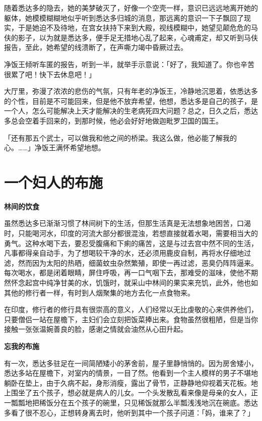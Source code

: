 \documentclass[twoside,openany]{book}
\newcommand{\mt}[1]{\textbullet \textbf{#1}}
\begin{document}
随着悉达多的隐去，她的美梦破灭了，好像一个空壳一样，意识已远远地离开她的躯体，她模模糊糊地似乎听到悉达多归城的消息，那远离的意识一下子飘回了现实，于是她迫不及待地，在宫女扶持下来到大殿，视线模糊中，她望见颠危危的马伕的影子，以为就是悉达多，便手足无措地心乱了起来，心魂甫定，却又听到马伕报告，至此，她希望的线溃断了，在声嘶力竭中昏厥过去。

净饭王倾听车匿的报告，听到一半，就举手示意说：「好了，我知道了。你也辛苦很累了吧！快下去休息吧！」

大厅里，弥漫了浓浓的悲伤的气氛，只有年老的净饭王，冷静地沉思着，依悉达多的个性，目前是不可能回来，但是他不放弃希望，他想，悉达多是自己的孩子，是一个人，怎么可能解决上天才能解决的生老病死四大问题？总之，日久之后，悉达多总会空着手回来的，到那时候，他必会好好地做迦毗罗卫国的国王。

「还有那五个武士，可以做我和他之间的桥梁。我这么做，他必能了解我的心。……」净饭王满怀希望地想。

\section{一个妇人的布施}\label{sec1.5}

\mt{林间的饮食}

虽然悉达多已渐渐习惯了林间树下的生活，但那生活真是无法想象地困苦，口渴时，只能喝河水，印度的河流大部分都很混浊，若想直接就着水喝，需要相当大的勇气。这种水喝下去，要忍受腹痛和下痢的痛苦，这是与过去宫中然不同的生活，凡事都得亲自动手，为了想喝较干净的水，还必须用鹿皮自制，再将水仔细地过滤，然而因为太阳的热晒，细菌蚊虫杂然繁殖，即使一再过滤，恶臭仍阵阵逼来。每次喝水，都是闭着眼睛，屏住呼吸，再一口气咽下去，那难受的滋味，使他不期然怀念起宫中纯净甘美的水，饥饿时，就采山中林间的果实来充饥，此外，他也如其他的修行者一样，有时到人烟聚集的地方去化一点食物来。

在印度，修行者的修行具有很崇高的意义，人们经常以无比虔敬的心来供养他们，只要僧侣一站在屋檐下，主妇们会立刻把饭菜捧出来。食物虽然很粗陋，但是当你接触一张张温婉善良的脸，感谢之情就会油然从心田升起。

\mt{忘我的布施}

有一次，悉达多驻足在一间简陋矮小的茅舍前，屋子里静悄悄的。因为房舍矮小，悉达多站在屋檐下，对室内的情景，一目了然。他看到一个主人模样的男子不堪地躺卧在垫上，由于久病不起，身形消瘦，露出了骨节，正静静地仰视着天花板。地上围坐了五个孩子，想必就是病人的儿女。一个头发散乱看来像是母亲的女人，正一瓢瓢地把稀饭分在五个孩子的碗里，只见稀饭就那么半瓢浅浅地沉在碗底。悉达多看了很不忍心，正想转身离去时，他听到其中一个孩子问道：「妈，谁来了？」
\end{document}
